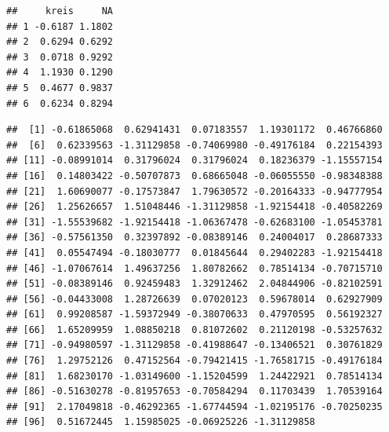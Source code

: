 \documentclass[]{article}
\newenvironment{Shaded}{\begin{snugshade}}{\end{snugshade}}
\newcommand{\KeywordTok}[1]{\textcolor[rgb]{0.13,0.29,0.53}{\textbf{{#1}}}}
\newcommand{\DecValTok}[1]{\textcolor[rgb]{0.00,0.00,0.81}{{#1}}}
\newcommand{\StringTok}[1]{\textcolor[rgb]{0.31,0.60,0.02}{{#1}}}
\newcommand{\CommentTok}[1]{\textcolor[rgb]{0.56,0.35,0.01}{\textit{{#1}}}}
\newcommand{\NormalTok}[1]{{#1}}
\begin{document}
\begin{Shaded}
\end{Shaded}

\begin{verbatim}
##     kreis     NA
## 1 -0.6187 1.1802
## 2  0.6294 0.6292
## 3  0.0718 0.9292
## 4  1.1930 0.1290
## 5  0.4677 0.9837
## 6  0.6234 0.8294
\end{verbatim}

\begin{Shaded}
\end{Shaded}

\begin{verbatim}
##  [1] -0.61865068  0.62941431  0.07183557  1.19301172  0.46766860
##  [6]  0.62339563 -1.31129858 -0.74069980 -0.49176184  0.22154393
## [11] -0.08991014  0.31796024  0.31796024  0.18236379 -1.15557154
## [16]  0.14803422 -0.50707873  0.68665048 -0.06055550 -0.98348388
## [21]  1.60690077 -0.17573847  1.79630572 -0.20164333 -0.94777954
## [26]  1.25626657  1.51048446 -1.31129858 -1.92154418 -0.40582269
## [31] -1.55539682 -1.92154418 -1.06367478 -0.62683100 -1.05453781
## [36] -0.57561350  0.32397892 -0.08389146  0.24004017  0.28687333
## [41]  0.05547494 -0.18030777  0.01845644  0.29402283 -1.92154418
## [46] -1.07067614  1.49637256  1.80782662  0.78514134 -0.70715710
## [51] -0.08389146  0.92459483  1.32912462  2.04844906 -0.82102591
## [56] -0.04433008  1.28726639  0.07020123  0.59678014  0.62927909
## [61]  0.99208587 -1.59372949 -0.38070633  0.47970595  0.56192327
## [66]  1.65209959  1.08850218  0.81072602  0.21120198 -0.53257632
## [71] -0.94980597 -1.31129858 -0.41988647 -0.13406521  0.30761829
## [76]  1.29752126  0.47152564 -0.79421415 -1.76581715 -0.49176184
## [81]  1.68230170 -1.03149600 -1.15204599  1.24422921  0.78514134
## [86] -0.51630278 -0.81957653 -0.70584294  0.11703439  1.70539164
## [91]  2.17049818 -0.46292365 -1.67744594 -1.02195176 -0.70250235
## [96]  0.51672445  1.15985025 -0.06925226 -1.31129858
\end{verbatim}
\end{document}
